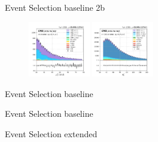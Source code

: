 \begin{frame}{Event Selection  baseline 2b}
\begin{figure}
        \includegraphics[width=0.24\textwidth]{chapters/Analysis/sectionPlots/figures/kinematics_pickles/etau/2b/etau_2b_lepton2_pt.pdf}
        \includegraphics[width=0.24\textwidth]{chapters/Analysis/sectionPlots/figures/kinematics_pickles/e4j/2b/e4j_2b_lepton1_pt.pdf}
    \end{figure}
\end{frame}

\begin{frame}{Event Selection baseline}
    \begin{table}
        \centering
        \setlength{\tabcolsep}{1em}
        \renewcommand{\arraystretch}{2}
        \resizebox{0.96\textwidth}{!}{}
    \end{table}
\end{frame}


\begin{frame}{Event Selection baseline}
    \begin{table}
        \centering
        \setlength{\tabcolsep}{1em}
        \renewcommand{\arraystretch}{2}
        \resizebox{0.99\textwidth}{!}{}
    \end{table}
\end{frame}


\begin{frame}{Event Selection extended}
    \begin{table}
        \centering
        \setlength{\tabcolsep}{1em}
        \renewcommand{\arraystretch}{2}
        \resizebox{0.7\textwidth}{!}{}
    \end{table}
\end{frame}




